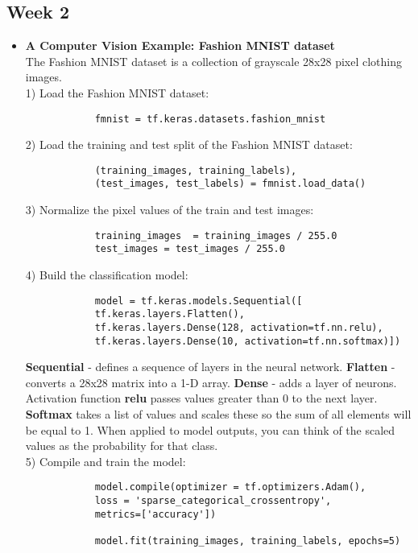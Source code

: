 \documentclass[16pt]{article}
\begin{document}
	\subsection{Week 2}
	\begin{itemize}
		\item \textbf{A Computer Vision Example: Fashion MNIST dataset}
		\\
		The Fashion MNIST dataset is a collection of grayscale 28x28 pixel clothing images.
		\\
		1) Load the Fashion MNIST dataset:
		\begin{verbatim}
			fmnist = tf.keras.datasets.fashion_mnist
		\end{verbatim}	
		2) Load the training and test split of the Fashion MNIST dataset:
		\begin{verbatim}
			(training_images, training_labels), 
			(test_images, test_labels) = fmnist.load_data()
		\end{verbatim}
		3) Normalize the pixel values of the train and test images:
		\begin{verbatim}
			training_images  = training_images / 255.0
			test_images = test_images / 255.0
		\end{verbatim}
		4) Build the classification model:
		\begin{verbatim}
			model = tf.keras.models.Sequential([
			tf.keras.layers.Flatten(), 
			tf.keras.layers.Dense(128, activation=tf.nn.relu), 
			tf.keras.layers.Dense(10, activation=tf.nn.softmax)])
		\end{verbatim}
		\textbf{Sequential} - defines a sequence of layers in the neural network. \textbf{Flatten} - converts a 28x28 matrix into a 1-D array. \textbf{Dense} - adds a layer of neurons.  
		Activation function \textbf{relu} passes values greater than 0 to the next layer. \textbf{Softmax} takes a list of values and scales these so the sum of all elements will be equal to 1. When applied to model outputs, you can think of the scaled values as the probability for that class.
		\\
		5) Compile and train the model:
		\begin{verbatim}
			model.compile(optimizer = tf.optimizers.Adam(),
			loss = 'sparse_categorical_crossentropy',
			metrics=['accuracy'])
			
			model.fit(training_images, training_labels, epochs=5)
		\end{verbatim}
	
	\end{itemize}
	
	
\end{document}
